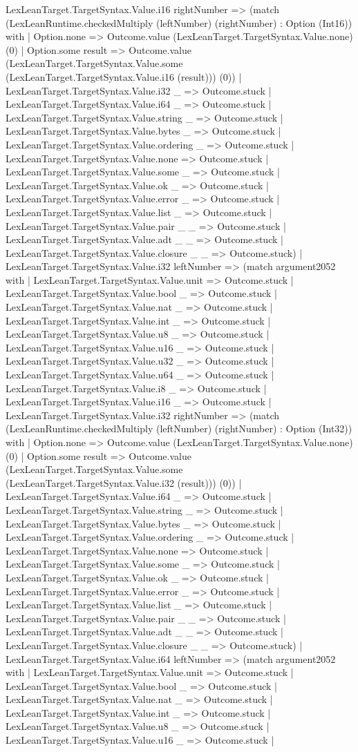 \documentclass[11pt]{article}
\begin{document}
LexLeanTarget.TargetSyntax.Value.i16 rightNumber => (match (LexLeanRuntime.checkedMultiply (leftNumber) (rightNumber) : Option (Int16)) with | Option.none => Outcome.value (LexLeanTarget.TargetSyntax.Value.none) (0) | Option.some result => Outcome.value (LexLeanTarget.TargetSyntax.Value.some (LexLeanTarget.TargetSyntax.Value.i16 (result))) (0)) | LexLeanTarget.TargetSyntax.Value.i32 \_ => Outcome.stuck | LexLeanTarget.TargetSyntax.Value.i64 \_ => Outcome.stuck | LexLeanTarget.TargetSyntax.Value.string \_ => Outcome.stuck | LexLeanTarget.TargetSyntax.Value.bytes \_ => Outcome.stuck | LexLeanTarget.TargetSyntax.Value.ordering \_ => Outcome.stuck | LexLeanTarget.TargetSyntax.Value.none => Outcome.stuck | LexLeanTarget.TargetSyntax.Value.some \_ => Outcome.stuck | LexLeanTarget.TargetSyntax.Value.ok \_ => Outcome.stuck | LexLeanTarget.TargetSyntax.Value.error \_ => Outcome.stuck | LexLeanTarget.TargetSyntax.Value.list \_ => Outcome.stuck | LexLeanTarget.TargetSyntax.Value.pair \_ \_ => Outcome.stuck | LexLeanTarget.TargetSyntax.Value.adt \_ \_ => Outcome.stuck | LexLeanTarget.TargetSyntax.Value.closure \_ \_ => Outcome.stuck) | LexLeanTarget.TargetSyntax.Value.i32 leftNumber => (match argument2052 with | LexLeanTarget.TargetSyntax.Value.unit => Outcome.stuck | LexLeanTarget.TargetSyntax.Value.bool \_ => Outcome.stuck | LexLeanTarget.TargetSyntax.Value.nat \_ => Outcome.stuck | LexLeanTarget.TargetSyntax.Value.int \_ => Outcome.stuck | LexLeanTarget.TargetSyntax.Value.u8 \_ => Outcome.stuck | LexLeanTarget.TargetSyntax.Value.u16 \_ => Outcome.stuck | LexLeanTarget.TargetSyntax.Value.u32 \_ => Outcome.stuck | LexLeanTarget.TargetSyntax.Value.u64 \_ => Outcome.stuck | LexLeanTarget.TargetSyntax.Value.i8 \_ => Outcome.stuck | LexLeanTarget.TargetSyntax.Value.i16 \_ => Outcome.stuck | LexLeanTarget.TargetSyntax.Value.i32 rightNumber => (match (LexLeanRuntime.checkedMultiply (leftNumber) (rightNumber) : Option (Int32)) with | Option.none => Outcome.value (LexLeanTarget.TargetSyntax.Value.none) (0) | Option.some result => Outcome.value (LexLeanTarget.TargetSyntax.Value.some (LexLeanTarget.TargetSyntax.Value.i32 (result))) (0)) | LexLeanTarget.TargetSyntax.Value.i64 \_ => Outcome.stuck | LexLeanTarget.TargetSyntax.Value.string \_ => Outcome.stuck | LexLeanTarget.TargetSyntax.Value.bytes \_ => Outcome.stuck | LexLeanTarget.TargetSyntax.Value.ordering \_ => Outcome.stuck | LexLeanTarget.TargetSyntax.Value.none => Outcome.stuck | LexLeanTarget.TargetSyntax.Value.some \_ => Outcome.stuck | LexLeanTarget.TargetSyntax.Value.ok \_ => Outcome.stuck | LexLeanTarget.TargetSyntax.Value.error \_ => Outcome.stuck | LexLeanTarget.TargetSyntax.Value.list \_ => Outcome.stuck | LexLeanTarget.TargetSyntax.Value.pair \_ \_ => Outcome.stuck | LexLeanTarget.TargetSyntax.Value.adt \_ \_ => Outcome.stuck | LexLeanTarget.TargetSyntax.Value.closure \_ \_ => Outcome.stuck) | LexLeanTarget.TargetSyntax.Value.i64 leftNumber => (match argument2052 with | LexLeanTarget.TargetSyntax.Value.unit => Outcome.stuck | LexLeanTarget.TargetSyntax.Value.bool \_ => Outcome.stuck | LexLeanTarget.TargetSyntax.Value.nat \_ => Outcome.stuck | LexLeanTarget.TargetSyntax.Value.int \_ => Outcome.stuck | LexLeanTarget.TargetSyntax.Value.u8 \_ => Outcome.stuck | LexLeanTarget.TargetSyntax.Value.u16 \_ => Outcome.stuck | 
\end{document}
